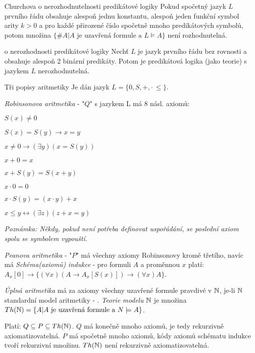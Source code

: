 \begin{vetaN}{Churchova o nerozhodnutelnosti predikátové logiky}
Pokud spočetný jazyk $L$ prvního řádu obsahuje alespoň jednu konstantu, alespoň jeden funkční symbol arity $k>0$ a pro každé přirozené číslo spočetně mnoho predikátových symbolů, potom množina $\{\#A|A \text{ je uzavřená formule a }L\models A\}$ není rozhodnutelná.
\end{vetaN}

\begin{vetaN}{o nerozhodnosti predikátové logiky}
Nechť $L$ je jazyk prvního řádu bez rovnosti a obsahuje alespoň 2 binární predikáty. Potom je predikátová logika (jako teorie) s jazykem $L$ nerozhodnutelná.
\end{vetaN}

\begin{definiceN}{Tři popisy aritmetiky}
Je dán jazyk $L=\{0,S,+,\cdot\,\leq\}$.
\begin{pitemize}
    \item \emph{Robinsonova aritmetika} - "$Q$" s jazykem L má 8 násl. axiomů:
    \begin{penumerate}
	\item $S(x)\neq 0$
	\item $S(x)=S(y)\rightarrow x=y$
	\item $x\neq 0\rightarrow (\exists y)(x=S(y))$
	\item $x+0=x$
	\item $x+S(y)=S(x+y)$
	\item $x\cdot 0=0$
	\item $x\cdot S(y)=(x\cdot y)+x$
	\item $x\leq y\leftrightarrow (\exists z)(z+x=y)$
    \end{penumerate}

    \textit{Poznámka: Někdy, pokud není potřeba definovat uspořádání, se poslední axiom spolu se symbolem \uv{\leq} vypouští.}

    \item \emph{Peanova aritmetika} - "$P$" má všechny axiomy Robinsonovy kromě třetího, navíc má 
	\emph{Schéma(axiomů) indukce} - pro formuli $A$ a proměnnou $x$ platí: $A_x[0]\rightarrow 
	\{(\forall x)(A\rightarrow A_x[S(x)])\rightarrow(\forall x)A\}$.
    \item \emph{Úplná aritmetika} má za axiomy všechny uzavřené formule pravdivé v $\mathbb{N}$, je-li $\mathbb{N}$
	standardní model aritmetiky - . \emph{Teorie modelu $\mathbb{N}$} je množina
	$Th(\mathbb{N})=\{A|A\text{ je uzavřená formule a } N\models A\}$.
\end{pitemize}
Platí: $Q\subseteq P\subseteq Th(\mathbb{N})$. $Q$ má konečně mnoho axiomů, je tedy rekurzivně axiomatizovatelná. $P$ má spočetně mnoho axiomů, kódy axiomů schématu indukce tvoří rekurzivní množinu. $Th(\mathbb{N})$ není rekurzivně axiomatizovatelná.
\end{definiceN}


